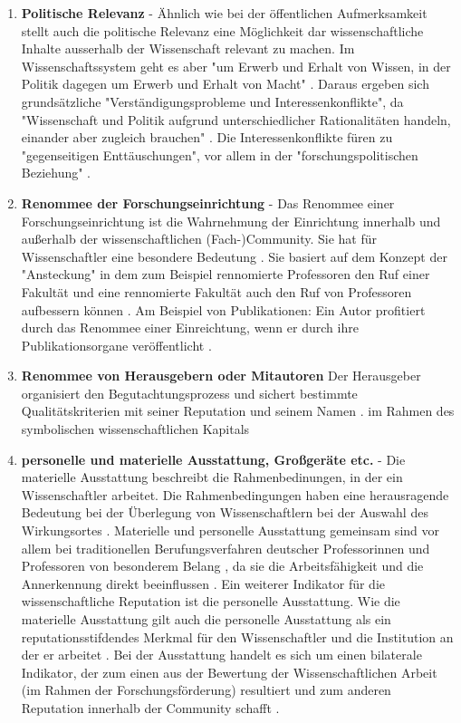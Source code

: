 \begin{enumerate}
\item \textbf{Politische Relevanz} - Ähnlich wie bei der öffentlichen Aufmerksamkeit stellt auch die politische Relevanz eine Möglichkeit dar wissenschaftliche Inhalte ausserhalb der Wissenschaft relevant zu machen. Im Wissenschaftssystem geht es aber "um Erwerb und Erhalt von Wissen, in der Politik dagegen um Erwerb und Erhalt von Macht" \cite{Mayntz_1996}. Daraus ergeben sich grundsätzliche "Verständigungsprobleme und Interessenkonflikte", da  "Wissenschaft und Politik aufgrund unterschiedlicher Rationalitäten handeln, einander aber zugleich brauchen" \cite{Mayntz_1996}. Die Interessenkonflikte füren zu "gegenseitigen Enttäuschungen", vor allem in der "forschungspolitischen Beziehung" \cite{Mayntz_1996}.
\item \textbf{Renommee der Forschungseinrichtung} - 
Das Renommee einer Forschungseinrichtung ist die Wahrnehmung der Einrichtung innerhalb und außerhalb der wissenschaftlichen (Fach-)Community. Sie hat für Wissenschaftler eine besondere Bedeutung \cite{mayntz_2008_wissensproduktion}. Sie basiert auf dem Konzept der "Ansteckung" in dem zum Beispiel rennomierte Professoren den Ruf einer Fakultät und eine rennomierte Fakultät auch den Ruf von Professoren aufbessern können \cite{luhmann_1970_selbststeuerung}. Am Beispiel von Publikationen: Ein Autor profitiert durch das Renommee einer Einreichtung, wenn er durch ihre Publikationsorgane veröffentlicht \cite{lutz_2012_zugang}.
\item \textbf{Renommee von Herausgebern oder Mitautoren} Der Herausgeber organisiert den Begutachtungsprozess und sichert bestimmte Qualitätskriterien mit seiner Reputation und seinem Namen \cite{mueller_2009_peerreview}. 
im Rahmen des symbolischen wissenschaftlichen Kapitals
\item \textbf{personelle und materielle Ausstattung, Großgeräte etc.} - 
Die materielle Ausstattung beschreibt die Rahmenbedinungen, in der ein Wissenschaftler arbeitet. Die Rahmenbedingungen haben eine herausragende Bedeutung bei der Überlegung von Wissenschaftlern bei der Auswahl des Wirkungsortes \cite{mayntz_2008_wissensproduktion}. Materielle und personelle Ausstattung gemeinsam sind vor allem bei traditionellen Berufungsverfahren deutscher Professorinnen und Professoren von besonderem Belang \cite{himpele_2011_job}, da sie die Arbeitsfähigkeit und die Annerkennung direkt beeinflussen \cite{suche}. Ein weiterer Indikator für die wissenschaftliche Reputation ist die personelle Ausstattung. Wie die materielle Ausstattung gilt auch die personelle Ausstattung als ein reputationsstifdendes Merkmal für den Wissenschaftler und die Institution an der er arbeitet \cite{mayntz_2008_wissensproduktion}. Bei der Ausstattung handelt es sich um einen bilaterale Indikator, der zum einen aus der Bewertung der Wissenschaftlichen Arbeit (im Rahmen der Forschungsförderung) resultiert \cite{Herb_vermessung_2008} und  zum anderen Reputation innerhalb der Community schafft \cite{mayntz_2008_wissensproduktion}.

\end{enumerate}
